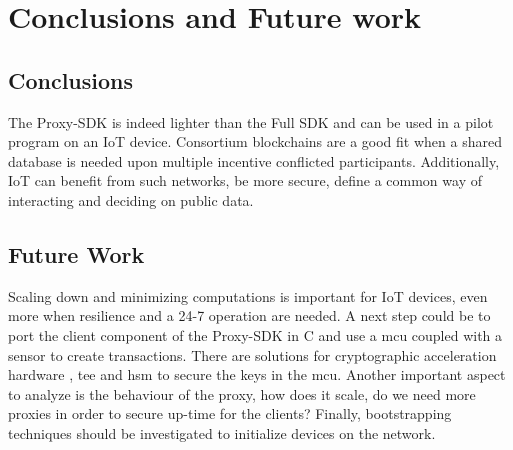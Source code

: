 \chapter{Conclusions and Future work}

\section{Conclusions}
The Proxy-SDK is indeed lighter than the Full SDK and can be used in a pilot program on an IoT device.
Consortium blockchains are a good fit when a shared database is needed upon multiple incentive conflicted participants. Additionally, IoT can benefit from such networks, be more secure, define a common way of interacting and deciding on public data. 

\section{Future Work}
Scaling down and minimizing computations is important for IoT devices, even more when resilience and a 24-7 operation are needed. A next step could be to port the client component of the Proxy-SDK in C and use a \acrshort{mcu} coupled with a sensor to create transactions. There are solutions for cryptographic acceleration hardware \cite{atecc-crypto}, \acrshort{tee} and \acrshort{hsm} to secure the keys in the \acrshort{mcu}. Another important aspect to analyze is the behaviour of the proxy, how does it scale, do we need more proxies in order to secure up-time for the clients? Finally, bootstrapping techniques should be investigated to initialize devices on the network.
